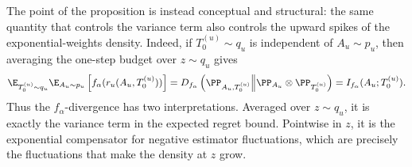 The point of the proposition is instead conceptual and structural: the same quantity that controls
the variance term also controls the upward spikes of the exponential-weights density. Indeed, if
\(T_0^{(u)}\sim q_u\) is independent of \(A_u\sim p_u\), then averaging the one-step budget over
\(z\sim q_u\) gives
\begin{align}
    \E_{T_0^{(u)}\sim q_u}
    \E_{A_u\sim p_u}
    \left[
    f_\alpha(r_u(A_u,T_0^{(u)}))
    \right]
    =
    D_{f_\alpha}
    \left(
    \PP_{A_u,T_0^{(u)}}
    \middle\|
    \PP_{A_u}\otimes \PP_{T_0^{(u)}}
    \right)
    =
    I_{f_\alpha}(A_u;T_0^{(u)}).
    \label{eq:pointwise_budget_averages_to_variance}
\end{align}
Thus the \(f_\alpha\)-divergence has two interpretations. Averaged over \(z\sim q_u\), it is exactly
the variance term in the expected regret bound. Pointwise in \(z\), it is the exponential compensator
for negative estimator fluctuations, which are precisely the fluctuations that make the density at
\(z\) grow.